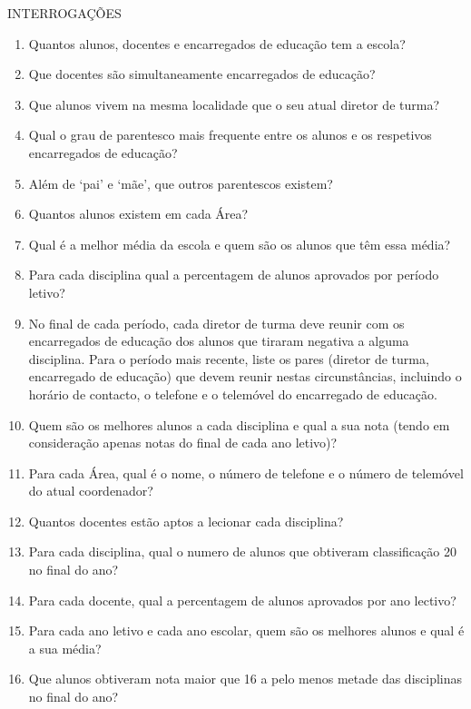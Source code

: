 \documentclass[12pt,a4paper,reqno]{report}
\numberwithin{figure}{section}
\numberwithin{equation}{section}
\begin{document}
INTERROGAÇÕES

\begin{enumerate}
	
	\item Quantos alunos, docentes e encarregados de educação tem a escola?
	
	\item Que docentes são simultaneamente encarregados de educação?
	
	\item Que alunos vivem na mesma localidade que o seu atual diretor de turma?
	
	\item Qual o grau de parentesco mais frequente entre os alunos e os respetivos encarregados de educação?
	
	\item Além de `pai' e `mãe', que outros parentescos existem?
	
	\item Quantos alunos existem em cada Área?
	
	\item Qual é a melhor média da escola e quem são os alunos que têm essa média?
	
	\item Para cada disciplina qual a percentagem de alunos aprovados por período letivo?
	
	\item No final de cada período, cada diretor de turma deve reunir com os encarregados de educação dos alunos que tiraram negativa a alguma disciplina. Para o período mais recente, liste os pares (diretor de turma, encarregado de educação) que devem reunir nestas circunstâncias, incluindo o horário de contacto, o telefone e o telemóvel do encarregado de educação.
	
	\item Quem são os melhores alunos a cada disciplina e qual a sua nota (tendo em consideração apenas notas do final de cada ano letivo)?
	
	\item Para cada Área, qual é o nome, o número de telefone e o número de telemóvel do atual coordenador?
	
	\item Quantos docentes estão aptos a lecionar cada disciplina?
	
	\item Para cada disciplina, qual o numero de alunos que obtiveram classificação 20 no final do ano?
	
	\item Para cada docente, qual a percentagem de alunos aprovados por ano lectivo?
		
	\item Para cada ano letivo e cada ano escolar, quem são os melhores alunos e qual é a sua média?
	
	\item Que alunos obtiveram nota maior que 16 a pelo menos metade das disciplinas no final do ano?
	
\end{enumerate}
\end{document}
